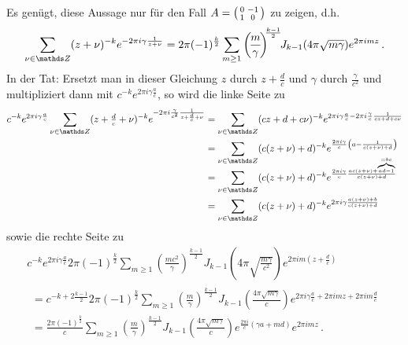 \begin{bewe}
\begin{bewe}
Es genügt, diese Aussage nur für den Fall $A = \mymat 0{-1}10$ zu zeigen, d.h.
\[
	\sum_{\nu \in \ZZ} (z + \nu)^{-k} e^{-2\pi i\gamma \frac{1}{z+\nu}} = 2\pi (-1)^{\frac k2} \sum_{m \geq 1} \left(\!\frac m\gamma\!\right)^{\!\!\frac{k-1}2} \!\! J_{k-1}(4\pi\sqrt{m\gamma}) e^{2\pi imz}
	\,.
\]
In der Tat: Ersetzt man in dieser Gleichung $z$ durch $z + \frac dc$ und $\gamma$ durch $\frac{\gamma}{c^2}$ und multipliziert dann mit $c^{-k} e^{2\pi i \gamma \frac ac}$, so wird die linke Seite zu
\begin{align*}
	c^{-k} e^{2\pi i\gamma \frac ac} \sum_{\nu \in \ZZ} (z + \tfrac dc + \nu)^{-k} e^{-2\pi i \frac{\gamma}{c^2} \frac{1}{z + \frac dc + \nu}} 
	&= \sum_{\nu \in \ZZ} (cz + d + c\nu)^{-k} e^{2\pi i\gamma \frac ac - 2\pi i \frac{\gamma}{c} \frac{1}{cz + d + c\nu}} \\
	&= \sum_{\nu \in \ZZ} (c(z + \nu) + d)^{-k} e^{\frac{2\pi i\gamma}c \left( a - \frac{1}{c(z + \nu) + d} \right)} \\[-12pt]
	&= \sum_{\nu \in \ZZ} (c(z + \nu) + d)^{-k} e^{\frac{2\pi i\gamma}c \frac{ac(z + \nu) + \overbrace{\scriptscriptstyle ad - 1}^{= bc}}{c(z + \nu) + d}} \\
	&= \sum_{\nu \in \ZZ} (c(z + \nu) + d)^{-k} e^{2\pi i\gamma \frac{a(z + \nu) + b}{c(z + \nu) + d}} \\
\end{align*}
sowie die rechte Seite zu
\begin{multline*}
	c^{-k} e^{2\pi i \gamma \frac ac} 2\pi (-1)^{\frac k2} \sum_{m\geq 1} \left(\!\frac {mc^2}{\gamma}\right)^{\!\!\frac {k-1}2} \!\! J_{k-1} \left(\! 4\pi \sqrt{\frac{m\gamma}{c^2}}\right) e^{2\pi i m(z + \frac dc)} \\
\begin{split}
	= c^{-k+2\frac{k-1}2} 2\pi (-1)^{\frac k2} \sum_{m\geq 1} \left(\!\frac {m}{\gamma}\!\right)^{\!\!\frac {k-1}2} \!\! J_{k-1} \left(\! \tfrac{4\pi \sqrt{m\gamma}}c\right) e^{2\pi i \gamma \frac ac + 2\pi i mz + 2\pi im\frac dc} \\
	= \frac{2\pi (-1)^{\frac k2}}c \sum_{m\geq 1} \left(\!\frac {m}{\gamma}\!\right)^{\!\!\frac {k-1}2} \!\! J_{k-1} \left(\! \tfrac{4\pi \sqrt{m\gamma}}c\right) e^{\frac{2\pi i}c \left(\gamma a + md\right)} e^{2\pi i mz}
	\,.
\end{split}
\end{multline*}


\end{bewe}
\end{bewe}
